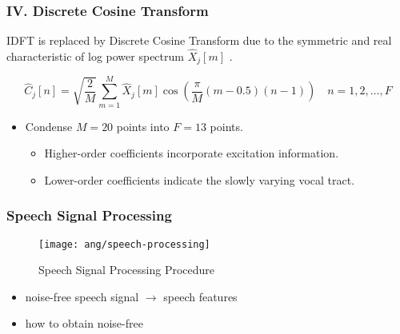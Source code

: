 
\begin{frame}
\frametitle{IV. Discrete Cosine Transform}
IDFT is replaced by Discrete Cosine Transform due to the symmetric and real characteristic of log power spectrum $\hat{X}_j[m]$ \cite{picone1993signal, iser2008bandwidth}.

\begin{equation}
\hat{C}_j[n] = \sqrt{\frac{2}{M}} \sum^{M}_{m=1} \hat{X}_j[m] \cos \left( \frac{\pi}{M} (m - 0.5) (n-1) \right) \quad n = 1, 2, \dots, F
\end{equation}

\begin{itemize}
	\item Condense $M = 20$ points into $F = 13$ points. \cite{tan2008automatic}
	\begin{itemize}
		\item Higher-order coefficients incorporate excitation information.
		\item Lower-order coefficients indicate the slowly varying vocal tract.
	\end{itemize}
\end{itemize}
\end{frame}

\begin{frame}
\frametitle{Speech Signal Processing}

\begin{figure}[H]
\centering
\texttt{[image: ang/speech-processing]}
\caption{Speech Signal Processing Procedure}
\end{figure}

\begin{itemize}
	\item noise-free speech signal $\longrightarrow$ speech features
	\item how to obtain noise-free
\end{itemize}
\end{frame}
